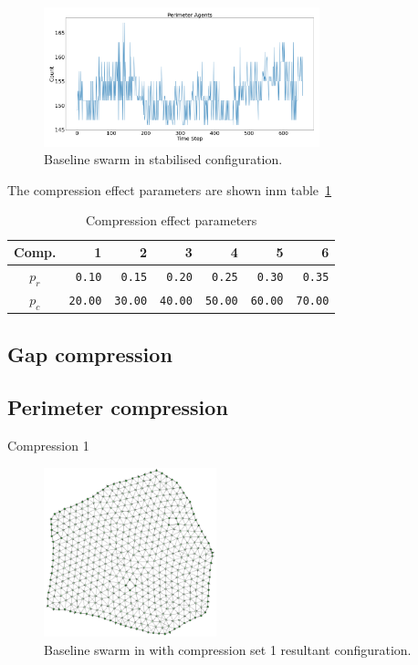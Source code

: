 \documentclass[12pt,a4paper]{IEEEtran}
\begin{document}
\begin{figure}[H]
	\begin{center}
		\includegraphics[width=8cm]{figures/baselineSwarmPerimeter}
	\end{center}
	\caption{Baseline swarm in stabilised configuration. \label{fig:baselineSwarmPerimeter}}
\end{figure}
The compression effect parameters are shown inm table~\ref{tab:compressionEffect}
\begin{table}[h]
	\centering
	\tiny
	\begin{tabular}{|c|r|r|r|r|r|r|}
		\hline
		\rowcolor[HTML]{000000} 
		{\color[HTML]{FFFFFF} Comp.} & {\color[HTML]{FFFFFF} 1} & {\color[HTML]{FFFFFF} 2} & {\color[HTML]{FFFFFF} 3} & {\color[HTML]{FFFFFF} 4} & {\color[HTML]{FFFFFF} 5} & {\color[HTML]{FFFFFF} 6}\\ \hline
		$p_r$ & \texttt{0.10} & \texttt{0.15} & \texttt{0.20} & \texttt{0.25} & \texttt{0.30} & \texttt{0.35} \\ \hline
		$p_c$ & \texttt{20.00}  & \texttt{30.00} & \texttt{40.00} & \texttt{50.00} & \texttt{60.00} & \texttt{70.00}\\ \hline
	\end{tabular}
  	\caption{Compression effect parameters}
	\label{tab:compressionEffect}
\end{table}
\subsection{Gap compression}
\subsection{Perimeter compression}

Compression 1

\begin{figure}[H]
	\begin{center}
		\includegraphics[width=5cm]{figures/baselineSwarm1}
	\end{center}
	\caption{Baseline swarm in with compression set 1 resultant configuration. \label{fig:baselineSwarm1}}
\end{figure}
\end{document}
